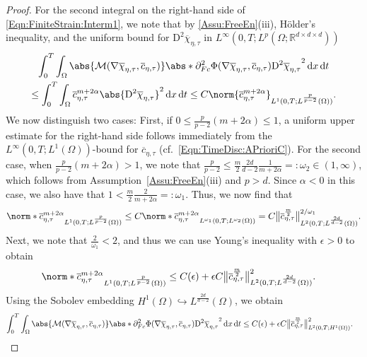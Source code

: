 \documentclass[a4paper,12pt]{article}
\newcommand{\R}{\mathbb{R}}
\newcommand{\calM}{\mathcal{M}}
\newcommand{\pl}{\partial}
\newcommand{\dx}{\mathrm{\,d}x}
\newcommand{\dt}{\mathrm{\,d}t}
\newcommand{\chibar}{\overline{\chi}}
\newcommand{\cbar}{\overline{c}}
\newcommand{\rmD}{\mathrm{D}}
\theoremstyle{plain}
\theoremstyle{definition}
\numberwithin{equation}{section}
\begin{document}
\begin{proof}
    
For the second integral on the right-hand side of \eqref{Eqn:FiniteStrain:Interm1}, we note that by \ref{Assu:FreeEn}(iii), Hölder's inequality, and the uniform bound for $\rmD^2\chibar_{\eta,\tau}$ in $L^\infty(0,T;L^p(\Omega;\R^{d\times d\times d}))$
\begin{multline*}
\int_0^T\int_\Omega \abs{\calM(\nabla\chibar_{\eta,\tau},\cbar_{\eta,\tau})}
\abs*{\pl^2_{Fc}\Phi(\nabla\chibar_{\eta,\tau},\cbar_{\eta,\tau})\rmD^2\chibar_{\eta,\tau}}^2 \dx\dt 
\\\leq \int_0^T\int_\Omega \cbar_{\eta,\tau}^{m+2\alpha}\abs{\rmD^2\chibar_{\eta,\tau}}^2\dx\dt
%
\leq C\norm{\cbar^{m+2\alpha}_{\eta,\tau}}_{L^1(0,T;L^\frac{p}{p-2}(\Omega))}.
\end{multline*}
We now distinguish two cases: First, if $0\leq \frac{p}{p-2}(m+2\alpha)\leq 1$, a uniform upper estimate for the right-hand side follows immediately from the $L^\infty(0,T;L^1(\Omega))$-bound for $\cbar_{\eta,\tau}$ (cf.~\eqref{Eqn:TimeDisc:APrioriC}). 
For the second case, when $\frac{p}{p-2}(m+2\alpha)>1$, we note that $\frac{p}{p-2}\leq \frac{m}{2}\frac{2d}{d-2}\frac{1}{m+2\alpha} =: \omega_2\in (1,\infty)$, which follows from Assumption~\ref{Assu:FreeEn}(iii) and $p>d$. Since $\alpha <0$ in this case,
we also have that $1<\frac{m}{2}\frac{2}{m+2\alpha}=:\omega_1$. 
Thus, we now find that
    \begin{align*}
        \norm*{\cbar^{m+2\alpha}_{\eta,\tau}}_{L^1(0,T;L^\frac{p}{p-2}(\Omega))} 
	    \leq C\norm*{\cbar_{\eta,\tau}^{m+2\alpha}}_{L^{\omega_1}(0,T;L^{\omega_2}(\Omega))}
        = C\big\|{\cbar_{\eta,\tau}^{\frac{m}{2}}}\big\|^{2/\omega_1}_{L^2(0,T;L^{\frac{2d}{d-2}}(\Omega))}.
	\end{align*}
    Next, we note that $\frac{2}{\omega_1}< 2$, and thus we can use Young's inequality with $\epsilon>0$ to obtain
    \begin{align*}
    \norm*{\cbar^{m+2\alpha}_{\eta,\tau}}_{L^1(0,T;L^\frac{p}{p-2}(\Omega))}
        &\leq  C(\epsilon) + \epsilon C\big\|{\cbar_{\eta,\tau}^{\frac{m}{2}}}\big\|^2_{L^2(0,T;L^{\frac{2d}{d-2}}(\Omega))}.
	\end{align*}
    Using the Sobolev embedding $H^1(\Omega)\hookrightarrow L^{\frac{2d}{d-2}}(\Omega)$, we obtain
    \begin{align*}
    	\int_0^T\int_\Omega \abs{\calM(\nabla\chibar_{\eta,\tau},\cbar_{\eta,\tau})}\abs*{\pl^2_{Fc}\Phi(\nabla\chibar_{\eta,\tau},\cbar_{\eta,\tau})\rmD^2\chibar_{\eta,\tau}}^2\dx\dt &\leq C(\epsilon) + \epsilon C\big\|{\cbar_{\eta,\tau}^{\frac{m}{2}}}\big\|^2_{L^2(0,T;H^1(\Omega))}.

\end{align*}
\end{proof}
\end{document}
